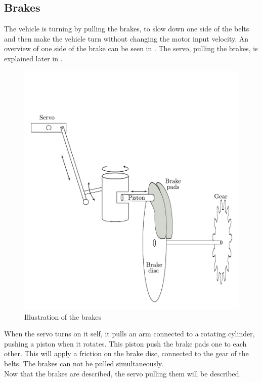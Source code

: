 \subsection{Brakes}

The vehicle is turning by pulling the brakes, to slow down one side of the belts and then make the vehicle turn without changing the motor input velocity. An overview of one side of the brake can be seen in . The servo, pulling the brakes, is explained later in .

 \begin{figure}[H]
	\centering
	\includegraphics[scale=0.6]{figures/brakeDescription.pdf}
	\caption{Illustration of the brakes}
	\label{Brakes}
\end{figure}

When the servo turns on it self, it pulls an arm connected to a rotating cylinder, pushing a piston when it rotates. This piston push the brake pads one to each other. This will apply a friction on the brake disc, connected to the gear of the belts. The brakes can not be pulled simultaneously.\\

Now that the brakes are described, the servo pulling them will be described.